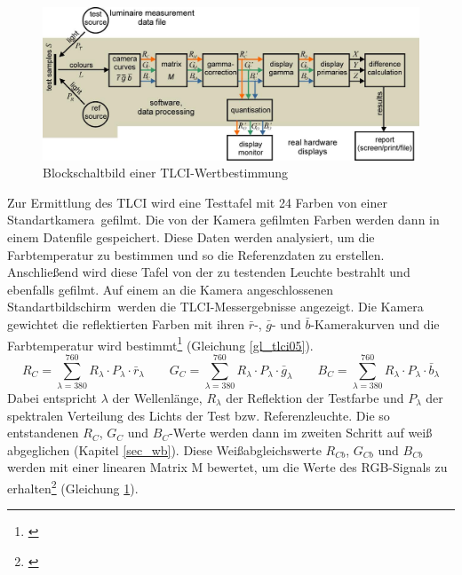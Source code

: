 \begin{figure}[htp]     %
\centering
\includegraphics[width=1.0\textwidth]{bilder/tlci1} 
\caption {Blockschaltbild einer TLCI-Wertbestimmung \protect\footnotemark}\label{b_tlci1}
\end{figure}
\noindent Zur Ermittlung des TLCI wird eine Testtafel mit 24 Farben von einer \glqq Standartkamera\grqq\ gefilmt. Die von der Kamera gefilmten Farben werden dann in einem Datenfile gespeichert. Diese Daten werden analysiert, um die Farbtemperatur zu bestimmen und so die Referenzdaten zu erstellen. Anschließend wird diese Tafel von der zu testenden Leuchte bestrahlt und ebenfalls gefilmt. Auf einem an die Kamera angeschlossenen \glqq Standartbildschirm\grqq\ werden die TLCI-Messergebnisse angezeigt. Die Kamera gewichtet die reflektierten Farben mit ihren $\bar{r}$-, $\bar{g}$- und $\bar{b}$-Kamerakurven und die Farbtemperatur wird bestimmt\footnote{\cite[16]{roberts}} (Gleichung \ref{gl_tlci05}).
\begin{equation}\label{gl_tlci05}
R_{C}=\sum_{\lambda=380}^{760} R_{\lambda} \cdot P_{\lambda} \cdot \bar{r}_{\lambda} \qquad G_{C}=\sum_{\lambda=380}^{760} R_{\lambda} \cdot P_{\lambda} \cdot \bar{g}_{\lambda} \qquad B_{C}=\sum_{\lambda=380}^{760} R_{\lambda} \cdot P_{\lambda} \cdot \bar{b}_{\lambda}
\end{equation}
Dabei entspricht $\lambda$ der Wellenlänge, $R_{\lambda}$ der Reflektion der Testfarbe und $P_{\lambda}$ der spektralen Verteilung des Lichts der Test bzw. Referenzleuchte.
\newpage
\noindent Die so entstandenen $R_{C}$, $G_{C}$ und $B_{C}$-Werte werden dann im zweiten Schritt auf weiß abgeglichen (Kapitel \ref{sec_wb}). Diese Weißabgleichswerte $R_{Cb}$, $G_{Cb}$ und $B_{Cb}$ werden mit einer linearen Matrix M bewertet, um die Werte des RGB-Signals zu erhalten\footnote{\cite[16]{roberts}} (Gleichung \ref{b_tlci1}).
